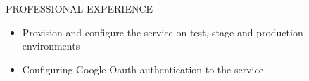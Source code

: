 \documentclass{resume} %
\begin{document}
\begin{rSection}{PROFESSIONAL EXPERIENCE}
\begin{rSubsection}
\begin{itemize}
    \item Provision and configure the service on test, stage and
      production environments
      
    \item Configuring Google Oauth authentication to the service

    \end{itemize}






    

    

    

\end{rSubsection}
\end{rSection}
\end{document}
